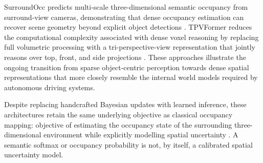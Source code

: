 \documentclass[graybox,envcountchap]{style/SNmono}
\providecommand{\DIFadd}[1]{{\protect\color{blue} #1}} %
\providecommand{\DIFdel}[1]{{\protect\color{red} #1}} %
\providecommand{\DIFaddbegin}{} %
\providecommand{\DIFaddend}{} %
\providecommand{\DIFdelbegin}{} %
\providecommand{\DIFdelend}{} %
\begin{document}
SurroundOcc predicts multi-scale three-dimensional semantic occupancy from surround-view cameras, demonstrating that dense occupancy estimation can recover scene geometry beyond explicit object detections \cite{wei2023_surroundocc}. TPVFormer reduces the computational complexity associated with dense voxel reasoning by replacing full volumetric processing with a tri-perspective-view representation that jointly reasons over top, front, and side projections \cite{huang2023_tpvformer}. These approaches illustrate the ongoing transition from sparse object-centric perception towards dense spatial representations that more closely resemble the internal world models required by autonomous driving systems.

Despite replacing handcrafted Bayesian updates with learned inference, these architectures retain the \DIFdelbegin \DIFdel{same underlying objective as classical occupancy mapping: }\DIFdelend \DIFaddbegin \DIFadd{objective of }\DIFaddend estimating the occupancy \DIFdelbegin \DIFdel{state }\DIFdelend of the surrounding three-dimensional environment\DIFdelbegin \DIFdel{while explicitly modelling spatial uncertainty }\DIFdelend \DIFaddbegin \DIFadd{. A semantic softmax or occupancy probability is not, by itself, a calibrated spatial uncertainty model}\DIFaddend .
\end{document}
